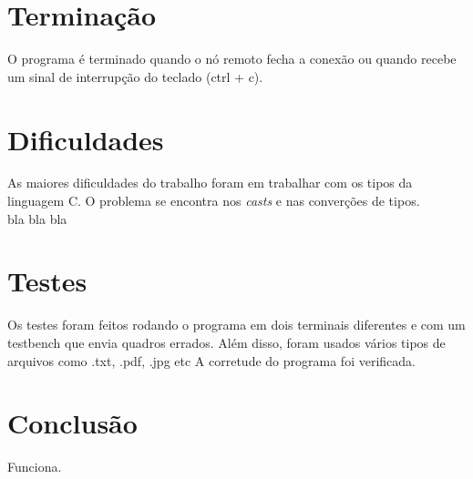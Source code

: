\documentclass[10pt]{article}
\begin{document}
	\section{Terminação}
		O programa é terminado quando o nó remoto fecha a conexão ou quando recebe um sinal de interrupção do teclado (ctrl + c).
	\section{Dificuldades}
		As maiores dificuldades do trabalho foram em trabalhar com os tipos da linguagem C. O problema se encontra nos \textit{casts} e nas converções de tipos.
		\\
		bla bla bla
	\section{Testes}
		Os testes foram feitos rodando o programa em dois terminais diferentes e com um testbench que envia quadros errados. Além disso, foram usados vários tipos de arquivos como .txt, .pdf, .jpg etc
		A corretude do programa foi verificada.
	\section{Conclusão} 
		Funciona.
\end{document}
